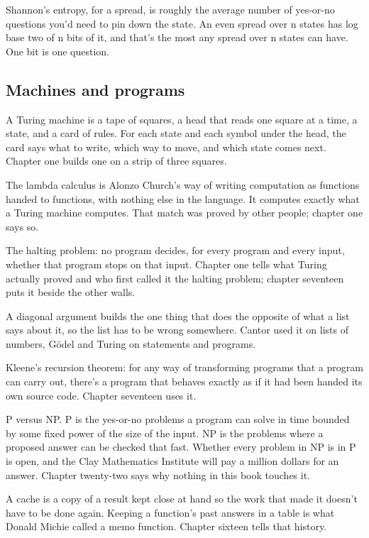 \documentclass[11pt,twoside]{article}
\theoremstyle{thielethm}
\theoremstyle{thieledef}
\theoremstyle{thieledef}
\theoremstyle{thieledef}
\theoremstyle{thielethm}
\theoremstyle{thieleobs}
\theoremstyle{thielethm}
\begin{document}
Shannon's entropy, for a spread, is roughly the average number of yes-or-no questions you'd need to pin down the state. An even spread over n states has log base two of n bits of it, and that's the most any spread over n states can have. One bit is one question.

\subsection{Machines and programs}

A Turing machine is a tape of squares, a head that reads one square at a time, a state, and a card of rules. For each state and each symbol under the head, the card says what to write, which way to move, and which state comes next. Chapter one builds one on a strip of three squares.

The lambda calculus is Alonzo Church's way of writing computation as functions handed to functions, with nothing else in the language. It computes exactly what a Turing machine computes. That match was proved by other people; chapter one says so.

The halting problem: no program decides, for every program and every input, whether that program stops on that input. Chapter one tells what Turing actually proved and who first called it the halting problem; chapter seventeen puts it beside the other walls.

A diagonal argument builds the one thing that does the opposite of what a list says about it, so the list has to be wrong somewhere. Cantor used it on lists of numbers, Gödel and Turing on statements and programs.

Kleene's recursion theorem: for any way of transforming programs that a program can carry out, there's a program that behaves exactly as if it had been handed its own source code. Chapter seventeen uses it.

P versus NP. P is the yes-or-no problems a program can solve in time bounded by some fixed power of the size of the input. NP is the problems where a proposed answer can be checked that fast. Whether every problem in NP is in P is open, and the Clay Mathematics Institute will pay a million dollars for an answer. Chapter twenty-two says why nothing in this book touches it.

A cache is a copy of a result kept close at hand so the work that made it doesn't have to be done again. Keeping a function's past answers in a table is what Donald Michie called a memo function. Chapter sixteen tells that history.
\end{document}
